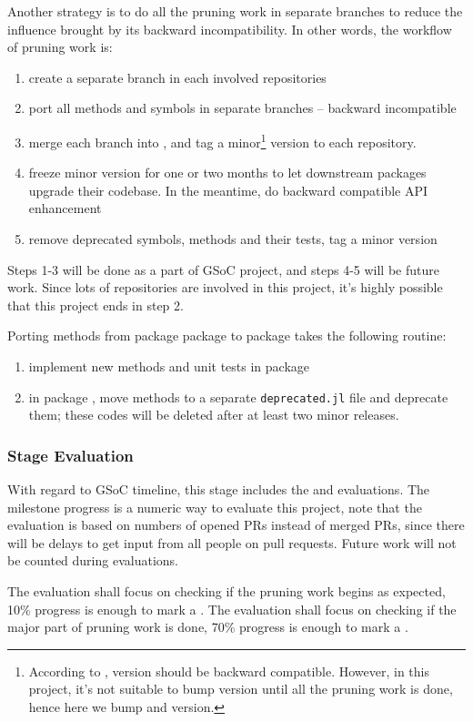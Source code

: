 \newcommand{\packageA}{package \sname{A}\xspace}
\newcommand{\packageB}{package \sname{B}\xspace}
Another strategy is to do all the pruning work in separate branches to reduce the influence brought by its backward incompatibility. In other words, the workflow of pruning work is:
\begin{enumerate}
    \item create a separate branch  in each involved repositories
    \item port all methods and symbols in separate branches -- backward incompatible
    \item merge each branch into , and tag a minor\footnote{According to \semanticversion{},  version should be backward compatible. However, in this project, it's not suitable to bump  version until all the pruning work is done, hence here we bump  and  version.} version to each repository.
    \item freeze minor version for one or two months to let downstream packages upgrade their codebase. In the meantime, do backward compatible API enhancement
    \item remove deprecated symbols, methods and their tests, tag a minor version
\end{enumerate}
Steps 1-3 will be done as a part of GSoC project, and steps 4-5 will be future work. Since lots of repositories are involved in this project, it's highly possible that this project ends in step 2.\par

Porting methods from package \packageA to \packageB takes the following routine:
\begin{enumerate}
    \item implement new methods and unit tests in \packageB
    \item in \packageA, move methods to a separate \texttt{deprecated.jl} file and deprecate them; these codes will be deleted after at least two minor releases.
\end{enumerate}

\subsubsection*{Stage Evaluation}

With regard to GSoC timeline, this stage includes the  and  evaluations. The milestone progress is a numeric way to evaluate this project, note that the evaluation is based on numbers of opened PRs instead of merged PRs, since there will be delays to get input from all people on pull requests. Future work will not be counted during evaluations.\par

The  evaluation shall focus on checking if the pruning work begins as expected, 10\% progress is enough to mark a . The  evaluation shall focus on checking if the major part of pruning work is done, 70\% progress is enough to mark a .
